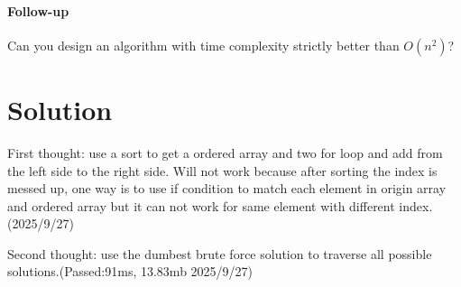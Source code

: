 \documentclass[12pt]{article}
\begin{document}
    \paragraph{Follow-up}
    Can you design an algorithm with time complexity strictly better than 
        \(O(n^{2})\)?

\section*{Solution}
    First thought: use a sort to get a ordered array and two for loop and add
        from the left side to the right side. Will not work because after 
        sorting the index is messed up, one way is to use if condition to match
        each element in origin array and ordered array but it can not work for
        same element with different index.(2025/9/27)

    Second thought: use the dumbest brute force solution to traverse all 
        possible solutions.(Passed:91ms, 13.83mb 2025/9/27)

    
\end{document}

